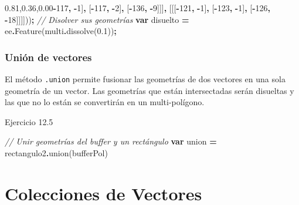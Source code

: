 \documentclass[
  12pt,
  letterpaper,
  twoside]{book}
\newenvironment{Shaded}{\begin{snugshade}}{\end{snugshade}}
\newcommand{\CommentTok}[1]{\textcolor[rgb]{0.56,0.35,0.01}{\textit{#1}}}
\newcommand{\DecValTok}[1]{\textcolor[rgb]{0.00,0.00,0.81}{#1}}
\newcommand{\FloatTok}[1]{\textcolor[rgb]{0.00,0.00,0.81}{#1}}
\newcommand{\FunctionTok}[1]{\textcolor[rgb]{0.00,0.00,0.00}{#1}}
\newcommand{\KeywordTok}[1]{\textcolor[rgb]{0.13,0.29,0.53}{\textbf{#1}}}
\newcommand{\NormalTok}[1]{#1}
\newcommand{\OperatorTok}[1]{\textcolor[rgb]{0.81,0.36,0.00}{\textbf{#1}}}
\begin{document}
\begin{Shaded}
\begin{Highlighting}[]
\NormalTok{             [[[}\OperatorTok{{-}}\DecValTok{117}\OperatorTok{,} \OperatorTok{{-}}\DecValTok{1}\NormalTok{]}\OperatorTok{,}
\NormalTok{               [}\OperatorTok{{-}}\DecValTok{117}\OperatorTok{,} \OperatorTok{{-}}\DecValTok{2}\NormalTok{]}\OperatorTok{,}
\NormalTok{               [}\OperatorTok{{-}}\DecValTok{136}\OperatorTok{,} \OperatorTok{{-}}\DecValTok{9}\NormalTok{]]]}\OperatorTok{,}
\NormalTok{             [[[}\OperatorTok{{-}}\DecValTok{121}\OperatorTok{,} \OperatorTok{{-}}\DecValTok{1}\NormalTok{]}\OperatorTok{,}
\NormalTok{               [}\OperatorTok{{-}}\DecValTok{123}\OperatorTok{,} \OperatorTok{{-}}\DecValTok{1}\NormalTok{]}\OperatorTok{,}
\NormalTok{               [}\OperatorTok{{-}}\DecValTok{126}\OperatorTok{,} \OperatorTok{{-}}\DecValTok{18}\NormalTok{]]]]))}\OperatorTok{;}
\CommentTok{// Disolver sus geometrías}
\KeywordTok{var}\NormalTok{ disuelto }\OperatorTok{=}\NormalTok{ ee}\OperatorTok{.}\FunctionTok{Feature}\NormalTok{(multi}\OperatorTok{.}\FunctionTok{dissolve}\NormalTok{(}\FloatTok{0.1}\NormalTok{))}\OperatorTok{;}
\end{Highlighting}
\end{Shaded}

\hypertarget{uniuxf3n-de-vectores}{%
\subsection{Unión de vectores}\label{uniuxf3n-de-vectores}}

El método \texttt{.union} permite fusionar las geometrías de dos vectores en una sola geometría de un vector. Las geometrías que están intersectadas serán disueltas y las que no lo están se convertirán en un multi-polígono.

Ejercicio 12.5

\begin{Shaded}
\begin{Highlighting}[]
\CommentTok{// Unir geometrías del buffer y un rectángulo }
\KeywordTok{var}\NormalTok{ union }\OperatorTok{=}\NormalTok{ rectangulo2}\OperatorTok{.}\FunctionTok{union}\NormalTok{(bufferPol)}
\end{Highlighting}
\end{Shaded}

\newpage

\hypertarget{colecciones-de-vectores}{%
\chapter{Colecciones de Vectores}\label{colecciones-de-vectores}}
\end{document}
